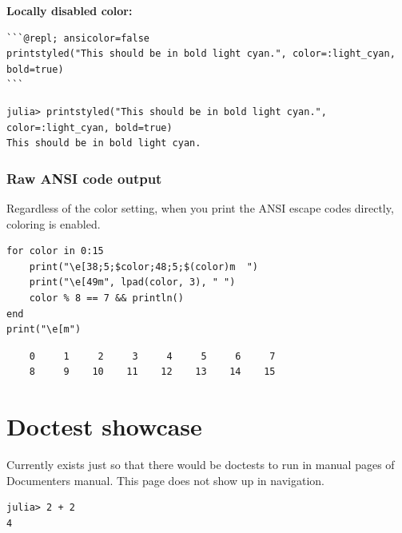 \textbf{Locally disabled color:}




\begin{verbatim}
```@repl; ansicolor=false
printstyled("This should be in bold light cyan.", color=:light_cyan, bold=true)
```
\end{verbatim}




\begin{verbatim}
julia> printstyled("This should be in bold light cyan.", color=:light_cyan, bold=true)
This should be in bold light cyan.
\end{verbatim}



\subsubsection{Raw ANSI code output}



\label{14348363050301630081}{}


Regardless of the color setting, when you print the ANSI escape codes directly, coloring is
enabled.




\begin{verbatim}
for color in 0:15
    print("\e[38;5;$color;48;5;$(color)m  ")
    print("\e[49m", lpad(color, 3), " ")
    color % 8 == 7 && println()
end
print("\e[m")
\end{verbatim}


\begin{verbatim}
    0     1     2     3     4     5     6     7
    8     9    10    11    12    13    14    15

\end{verbatim}



\section{Doctest showcase}



\label{12024751884047346933}{}


Currently exists just so that there would be doctests to run in manual pages of Documenter{\textquotesingle}s
manual. This page does not show up in navigation.




\begin{verbatim}
julia> 2 + 2
4
\end{verbatim}



